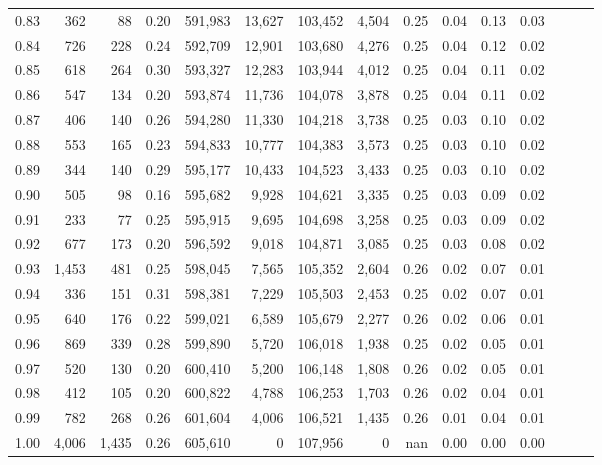 \begin{tabular}{rrrrrrrrrrrrrrr}
0.83 &     362 &     88 &  0.20 &  591,983 &   13,627 &  103,452 &    4,504 &  0.25 &  0.04 &  0.13 &      0.03 \\
0.84 &     726 &    228 &  0.24 &  592,709 &   12,901 &  103,680 &    4,276 &  0.25 &  0.04 &  0.12 &      0.02 \\
0.85 &     618 &    264 &  0.30 &  593,327 &   12,283 &  103,944 &    4,012 &  0.25 &  0.04 &  0.11 &      0.02 \\
0.86 &     547 &    134 &  0.20 &  593,874 &   11,736 &  104,078 &    3,878 &  0.25 &  0.04 &  0.11 &      0.02 \\
0.87 &     406 &    140 &  0.26 &  594,280 &   11,330 &  104,218 &    3,738 &  0.25 &  0.03 &  0.10 &      0.02 \\
0.88 &     553 &    165 &  0.23 &  594,833 &   10,777 &  104,383 &    3,573 &  0.25 &  0.03 &  0.10 &      0.02 \\
0.89 &     344 &    140 &  0.29 &  595,177 &   10,433 &  104,523 &    3,433 &  0.25 &  0.03 &  0.10 &      0.02 \\
0.90 &     505 &     98 &  0.16 &  595,682 &    9,928 &  104,621 &    3,335 &  0.25 &  0.03 &  0.09 &      0.02 \\
0.91 &     233 &     77 &  0.25 &  595,915 &    9,695 &  104,698 &    3,258 &  0.25 &  0.03 &  0.09 &      0.02 \\
0.92 &     677 &    173 &  0.20 &  596,592 &    9,018 &  104,871 &    3,085 &  0.25 &  0.03 &  0.08 &      0.02 \\
0.93 &   1,453 &    481 &  0.25 &  598,045 &    7,565 &  105,352 &    2,604 &  0.26 &  0.02 &  0.07 &      0.01 \\
0.94 &     336 &    151 &  0.31 &  598,381 &    7,229 &  105,503 &    2,453 &  0.25 &  0.02 &  0.07 &      0.01 \\
0.95 &     640 &    176 &  0.22 &  599,021 &    6,589 &  105,679 &    2,277 &  0.26 &  0.02 &  0.06 &      0.01 \\
0.96 &     869 &    339 &  0.28 &  599,890 &    5,720 &  106,018 &    1,938 &  0.25 &  0.02 &  0.05 &      0.01 \\
0.97 &     520 &    130 &  0.20 &  600,410 &    5,200 &  106,148 &    1,808 &  0.26 &  0.02 &  0.05 &      0.01 \\
0.98 &     412 &    105 &  0.20 &  600,822 &    4,788 &  106,253 &    1,703 &  0.26 &  0.02 &  0.04 &      0.01 \\
0.99 &     782 &    268 &  0.26 &  601,604 &    4,006 &  106,521 &    1,435 &  0.26 &  0.01 &  0.04 &      0.01 \\
1.00 &   4,006 &  1,435 &  0.26 &  605,610 &        0 &  107,956 &        0 &   nan &  0.00 &  0.00 &      0.00 \\
\bottomrule
\end{tabular}
